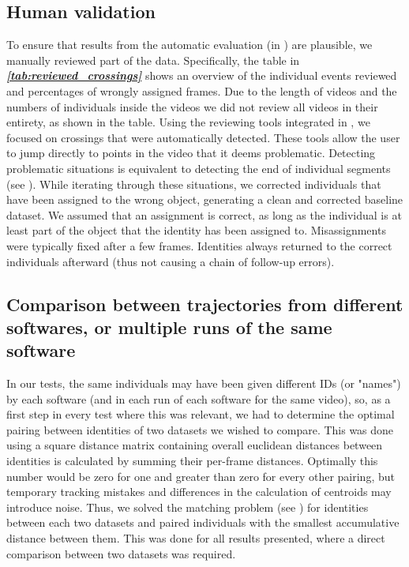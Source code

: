 \documentclass[9pt,lineno]{elife}
\newcommand{\tableref}[1]{\textit{\textbf{\ref{tab:#1}}}\xspace}
\newcommand{\TRex}{\protect\path{TRex}}
\begin{document}
\begin{appendixbox}

\subsection{Human validation} \label{sec:human_validation}

To ensure that results from the automatic evaluation (in ) are plausible, we manually reviewed part of the data. Specifically, the table in \tableref{reviewed_crossings} shows an overview of the individual events reviewed and percentages of wrongly assigned frames. Due to the length of videos and the numbers of individuals inside the videos we did not review all videos in their entirety, as shown in the table. Using the reviewing tools integrated in \TRex{}, we focused on crossings that were automatically detected. These tools allow the user to jump directly to points in the video that it deems problematic. Detecting problematic situations is equivalent to detecting the end of individual segments (see ). While iterating through these situations, we corrected individuals that have been assigned to the wrong object, generating a clean and corrected baseline dataset. We assumed that an assignment is correct, as long as the individual is at least part of the object that the identity has been assigned to. Misassignments were typically fixed after a few frames. Identities always returned to the correct individuals afterward (thus not causing a chain of follow-up errors).

\subsection{Comparison between trajectories from different softwares, or multiple runs of the same software}

In our tests, the same individuals may have been given different IDs (or "names") by each software (and in each run of each software for the same video), so, as a first step in every test where this was relevant, we had to determine the optimal pairing between identities of two datasets we wished to compare. This was done using a square distance matrix containing overall euclidean distances between identities is calculated by summing their per-frame distances. Optimally this number would be zero for one and greater than zero for every other pairing, but temporary tracking mistakes and differences in the calculation of centroids may introduce noise. Thus, we solved the matching problem (see ) for identities between each two datasets and paired individuals with the smallest accumulative distance between them. This was done for all results presented, where a direct comparison between two datasets was required.

\end{appendixbox}
\end{document}
